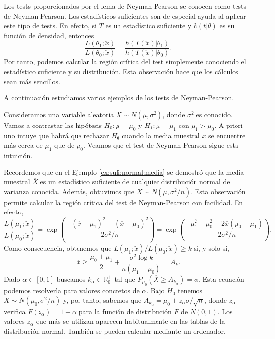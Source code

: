         Los tests proporcionados por el lema de Neyman-Pearson se conocen como tests de Neyman-Pearson. Los estadísticos suficientes son de especial ayuda al aplicar este tipo de tests. En efecto, si $T$ es un estadístico suficiente y $h(t | \theta)$ es su función de densidad, entonces
        \[\frac{L(\theta_1;\utilde{x})}{L(\theta_0;\utilde{x})} = \frac{h(T(\utilde{x}) | \theta_1)}{h(T(\utilde{x}) | \theta_0)}.\]
        Por tanto, podemos calcular la región crítica del test simplemente conociendo el estadístico suficiente y su distribución. Esta observación hace que los cálculos sean más sencillos.

        A continuación estudiamos varios ejemplos de los tests de Neyman-Pearson.

        \begin{ex} \label{ex:np:1}
            Consideramos una variable aleatoria $X \sim N(\mu, \sigma^2)$, donde $\sigma^2$ es conocido. Vamos a contrastar las hipótesis $H_0 : \mu = \mu_0$ y $H_1 : \mu = \mu_1$ con $\mu_1 > \mu_0$. A priori uno intuye que habrá que rechazar $H_0$ cuando la media muestral $\overline{x}$ se encuentre más cerca de $\mu_1$ que de $\mu_0$. Veamos que el test de Neyman-Pearson sigue esta intuición.

            Recordemos que en el Ejemplo \ref{ex:sufi:normal:media} se demostró que la media muestral $\overline{X}$ es un estadístico suficiente de cualquier distribución normal de varianza conocida. Además, obtuvimos que $\overline{X} \sim N(\mu, \sigma^2 / n)$. Esta observación permite calcular la región crítica del test de Neyman-Pearson con facilidad. En efecto,
            \[\frac{L(\mu_1;\utilde{x})}{L(\mu_0;\utilde{x})} = \exp\left(-\frac{(\overline{x} - \mu_1)^2 - (\overline{x} - \mu_0)^2}{2\sigma^2/n}\right) = \exp\left(-\frac{\mu_1^2 - \mu_0^2 + 2\overline{x}(\mu_0-\mu_1)}{2\sigma^2/n}\right).\]
            Como consecuencia, obtenemos que $L(\mu_1;\utilde{x}) / L(\mu_0;\utilde{x}) \ge k$ si, y solo si,
            \[\overline{x} \ge \frac{\mu_0+\mu_1}{2} + \frac{\sigma^2 \log k}{n(\mu_1 - \mu_0)} = A_k.\]
            Dado $\alpha \in [0,1]$ buscamos $k_\alpha \in \mathbb{R}^+_0$ tal que $P_{\mu_0}(\overline{X} \ge A_{k_\alpha}) = \alpha$. Esta ecuación podemos resolverla para valores concretos de $\alpha$. Bajo $H_0$ tenemos $\overline{X} \sim N(\mu_0, \sigma^2 / n)$ y, por tanto, sabemos que $A_{k_\alpha} = \mu_0 + z_\alpha \sigma / \sqrt{n}$, donde $z_\alpha$ verifica $F(z_\alpha) = 1 - \alpha$ para la función de distribución $F$ de $N(0,1)$. Los valores $z_\alpha$ que más se utilizan aparecen habitualmente en las tablas de la distribución normal. También se pueden calcular mediante un ordenador.


\end{ex}

